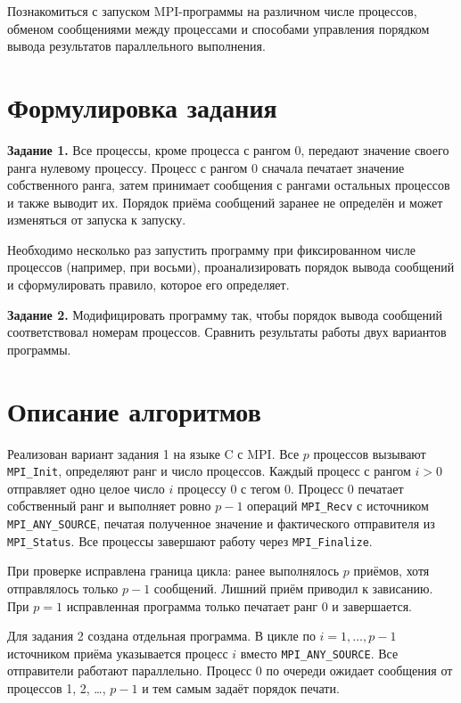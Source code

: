 \documentclass[14pt,a4paper]{extarticle}
\begin{document}
Познакомиться с запуском MPI-программы на различном числе процессов,
обменом сообщениями между процессами и способами управления порядком вывода
результатов параллельного выполнения.

\section{Формулировка задания}

\textbf{Задание 1.} Все процессы, кроме процесса с рангом 0, передают
значение своего ранга нулевому процессу. Процесс с рангом 0 сначала печатает
значение собственного ранга, затем принимает сообщения с рангами остальных
процессов и также выводит их. Порядок приёма сообщений заранее не определён и
может изменяться от запуска к запуску.

Необходимо несколько раз запустить программу при фиксированном числе
процессов (например, при восьми), проанализировать порядок вывода сообщений и
сформулировать правило, которое его определяет.

\textbf{Задание 2.} Модифицировать программу так, чтобы порядок вывода
сообщений соответствовал номерам процессов. Сравнить результаты работы двух
вариантов программы.

\section{Описание алгоритмов}

Реализован вариант задания 1 на языке C с MPI. Все $p$ процессов вызывают
\texttt{MPI\_Init}, определяют ранг и число процессов. Каждый процесс с
рангом $i>0$ отправляет одно целое число $i$ процессу 0 с тегом 0.
Процесс 0 печатает собственный ранг и выполняет ровно $p-1$ операций
\texttt{MPI\_Recv} с источником \texttt{MPI\_ANY\_SOURCE}, печатая
полученное значение и фактического отправителя из \texttt{MPI\_Status}.
Все процессы завершают работу через \texttt{MPI\_Finalize}.

При проверке исправлена граница цикла: ранее выполнялось $p$ приёмов,
хотя отправлялось только $p-1$ сообщений. Лишний приём приводил к зависанию.
При $p=1$ исправленная программа только печатает ранг 0 и завершается.

Для задания 2 создана отдельная программа. В цикле по
$i=1,\ldots,p-1$ источником приёма указывается процесс $i$ вместо
\texttt{MPI\_ANY\_SOURCE}. Все отправители работают параллельно. Процесс 0
по очереди ожидает сообщения от процессов 1, 2, \ldots, $p-1$ и тем самым
задаёт порядок печати.
\end{document}
